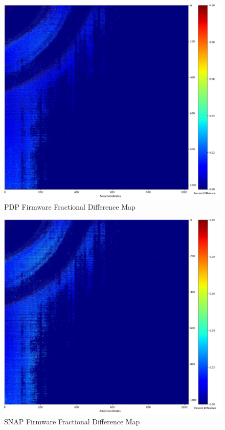             \begin{figure}[t]
                \centering
                \includegraphics[width=1.0\textwidth]{fig/fractional_difference_pdp.jpg}
                \caption{PDP Firmware Fractional Difference Map}
                \label{fig:fractional_difference_pdp}
            \end{figure}

            \begin{figure}[t]
                \centering
                \includegraphics[width=1.0\textwidth]{fig/fractional_difference_snap.jpg}
                \caption{SNAP Firmware Fractional Difference Map}
                \label{fig:fractional_difference_snap}
            \end{figure}


